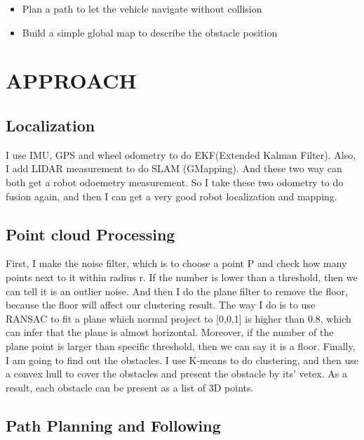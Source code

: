 \documentclass[letterpaper, 10 pt, conference]{ieeeconf}  %
\begin{document}
\begin{itemize}
\item Plan a path to let the vehicle navigate without collision
\end{itemize}

\begin{itemize}
\item Build a simple global map to describe the obstacle position
\end{itemize}

\section{APPROACH}

\subsection{Localization}

I use IMU, GPS and wheel odometry to do EKF(Extended Kalman Filter). Also, I add LIDAR measurement to do SLAM (GMapping). And these two way can both get a robot odoemetry measurement. So I take these two odometry to do fusion again, and then I can get a very good robot localization and mapping.

\subsection{Point cloud Processing}

First, I make the noise filter, which is to choose a point P and check how many points next to it within radius r. If the number is lower than a threshold, then we can tell it is an outlier noise.
And then I do the plane filter to remove the floor, because the floor will affect our clustering result. The way I do is to use RANSAC to fit a plane which normal project to [0,0,1] is higher than 0.8, which can infer that the plane is almost horizontal. Moreover, if the number of the plane point is larger than specific threshold, then we can say it is a floor.
Finally, I am going to find out the obstacles. I use K-means to do clustering, and then use a convex hull to cover the obstacles and present the obstacle by its' vetex. As a result, each obstacle can be present as a list of 3D points.

\subsection{Path Planning and Following}
\end{document}
